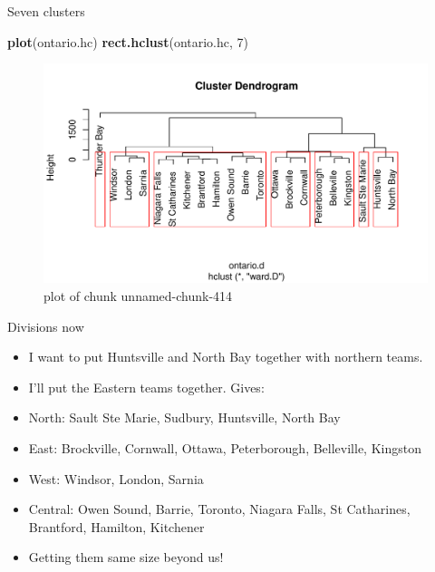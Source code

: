 \documentclass[ignorenonframetext,]{beamer}
\newenvironment{Shaded}{\begin{snugshade}}{\end{snugshade}}
\newcommand{\DecValTok}[1]{\textcolor[rgb]{0.00,0.00,0.81}{#1}}
\newcommand{\KeywordTok}[1]{\textcolor[rgb]{0.13,0.29,0.53}{\textbf{#1}}}
\newcommand{\NormalTok}[1]{#1}
\begin{document}
\begin{frame}[fragile]{Seven clusters}
\protect\hypertarget{seven-clusters}{}

\begin{Shaded}
\begin{Highlighting}[]
\KeywordTok{plot}\NormalTok{(ontario.hc)}
\KeywordTok{rect.hclust}\NormalTok{(ontario.hc, }\DecValTok{7}\NormalTok{)}
\end{Highlighting}
\end{Shaded}

\begin{figure}
\centering
\includegraphics{figure/unnamed-chunk-414-1.pdf}
\caption{plot of chunk unnamed-chunk-414}
\end{figure}

\end{frame}

\begin{frame}{Divisions now}
\protect\hypertarget{divisions-now}{}

\begin{itemize}
\item
  I want to put Huntsville and North Bay together with northern teams.
\item
  I'll put the Eastern teams together. Gives:
\item
  North: Sault Ste Marie, Sudbury, Huntsville, North Bay
\item
  East: Brockville, Cornwall, Ottawa, Peterborough, Belleville, Kingston
\item
  West: Windsor, London, Sarnia
\item
  Central: Owen Sound, Barrie, Toronto, Niagara Falls, St Catharines,
  Brantford, Hamilton, Kitchener
\item
  Getting them same size beyond us!
\end{itemize}

\end{frame}
\end{document}
